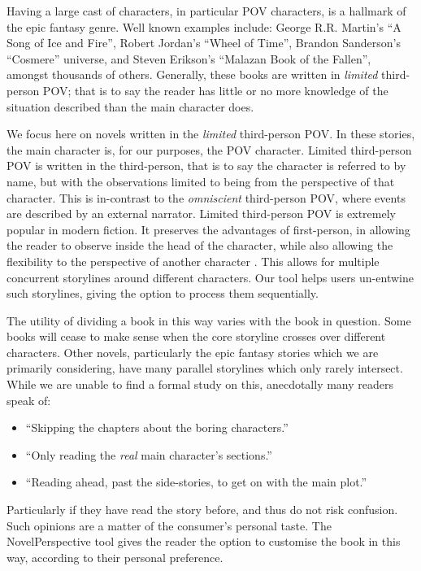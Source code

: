 \documentclass[11pt,a4paper]{article}
\newcommand{\parencite}{\citep}
\begin{document}
Having a large cast of characters, in particular POV characters, is a hallmark of the epic fantasy genre.
Well known examples include: George R.R. Martin's ``A Song of Ice and Fire'', 
Robert Jordan's ``Wheel of Time'', Brandon Sanderson's ``Cosmere'' universe, and
Steven Erikson's ``Malazan Book of the Fallen'', amongst thousands of others.
Generally, these books are written in \emph{limited} third-person POV;
that is to say the reader has little or no more knowledge of the situation described than the main character does.

We focus here on novels written in the \emph{limited} third-person POV.
In these stories, the main character is, for our purposes, the POV character.
Limited third-person POV is written in the third-person, that is to say the character is referred to by name, but with the observations limited to being from the perspective of that character.
This is in-contrast to the \emph{omniscient} third-person POV, where events are described by an external narrator.
Limited third-person POV is extremely popular in modern fiction.
It preserves the advantages of first-person, in allowing the reader to observe inside the head of the character, while also allowing the flexibility to the perspective of another character \parencite{booth2010rhetoric}.
This allows for multiple concurrent storylines around different characters.
Our tool helps users un-entwine such storylines, giving the option to process them sequentially.


The utility of dividing a book in this way varies with the book in question.
Some books will cease to make sense when the core storyline crosses over different characters.
Other novels, particularly the epic fantasy stories which we are primarily considering,
have many parallel storylines which only rarely intersect.
While we are unable to find a formal study on this, 
anecdotally many readers speak of:
\begin{itemize}
	\item ``Skipping the chapters about the boring characters.''
	\item ``Only reading the \emph{real} main character's sections.''
	\item ``Reading ahead, past the side-stories, to get on with the main plot.''	
\end{itemize}
Particularly if they have read the story before, and thus do not risk confusion.
Such opinions are a matter of the consumer's personal taste.
The NovelPerspective tool gives the reader the option to customise the book in this way, according to their personal preference.
\end{document}
